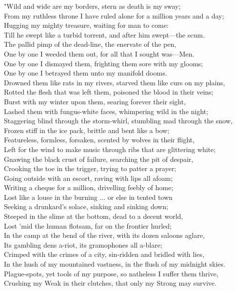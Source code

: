\begin{adjustwidth}{0em}{0em}
\begin{poemblock}
"Wild and wide are my borders, stern as death is my sway;\\
From my ruthless throne I have ruled alone for a million years and a day;\\
Hugging my mighty treasure, waiting for man to come:\\
Till he swept like a turbid torrent, and after him swept—the scum.\\
The pallid pimp of the dead-line, the enervate of the pen,\\
One by one I weeded them out, for all that I sought was—Men.\\
One by one I dismayed them, frighting them sore with my glooms;\\
One by one I betrayed them unto my manifold dooms.\\
Drowned them like rats in my rivers, starved them like curs on my plains,\\
Rotted the flesh that was left them, poisoned the blood in their veins;\\
Burst with my winter upon them, searing forever their sight,\\
Lashed them with fungus-white faces, whimpering wild in the night;\\
Staggering blind through the storm-whirl, stumbling mad through the snow,\\
Frozen stiff in the ice pack, brittle and bent like a bow;\\
Featureless, formless, forsaken, scented by wolves in their flight,\\
Left for the wind to make music through ribs that are glittering white;\\
Gnawing the black crust of failure, searching the pit of despair,\\
Crooking the toe in the trigger, trying to patter a prayer;\\
Going outside with an escort, raving with lips all afoam;\\
Writing a cheque for a million, drivelling feebly of home;\\
Lost like a louse in the burning ... or else in tented town\\
Seeking a drunkard's solace, sinking and sinking down;\\
Steeped in the slime at the bottom, dead to a decent world,\\
Lost 'mid the human flotsam, far on the frontier hurled;\\
In the camp at the bend of the river, with its dozen saloons aglare,\\
Its gambling dens a-riot, its gramophones all a-blare;\\
Crimped with the crimes of a city, sin-ridden and bridled with lies,\\
In the hush of my mountained vastness, in the flush of my midnight skies.\\
Plague-spots, yet tools of my purpose, so natheless I suffer them thrive,\\
Crushing my Weak in their clutches, that only my Strong may survive.


\end{poemblock}
\end{adjustwidth}
